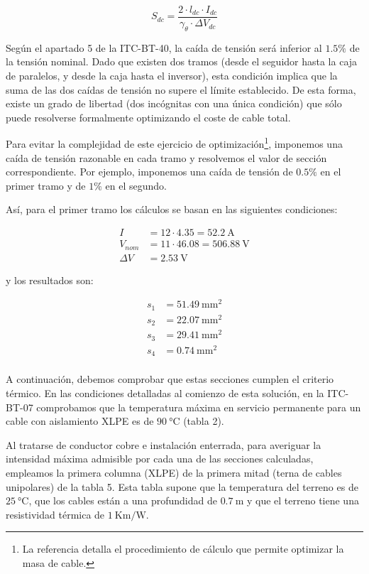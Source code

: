 \[S_{dc} =  \frac{2\cdot l_{dc}\cdot I_{dc}}{\gamma_\theta\cdot\Delta V_{dc}}\]

Según el apartado 5 de la ITC-BT-40, la caída de tensión será inferior
al $1.5\%$ de la tensión nominal. Dado que existen dos tramos (desde el
seguidor hasta la caja de paralelos, y desde la caja hasta el
inversor), esta condición implica que la suma de las dos caídas de
tensión no supere el límite establecido. De esta forma, existe un
grado de libertad (dos incógnitas con una única condición) que sólo
puede resolverse formalmente optimizando el coste de cable total. 

Para evitar la complejidad de este ejercicio de
optimización\footnote{La referencia \cite{Perpinan2012b} detalla el
  procedimiento de cálculo que permite optimizar la masa de cable.}, imponemos una
caída de tensión razonable en cada tramo y resolvemos el valor de
sección correspondiente. Por ejemplo, imponemos una caída de tensión
de $0.5\%$ en el primer tramo y de $1\%$  en el segundo.

Así, para el primer tramo los cálculos se basan en las siguientes condiciones:

\begin{align*}
  I & = 12 \cdot 4.35 = \SI{52.2}{\ampere}\\
  V_{nom} & = 11 \cdot 46.08 = \SI{506.88}{\volt}\\
  \Delta V & = \SI{2.53}{\volt}
\end{align*}

y los resultados son:

\begin{align*}
  s_1 & = \SI{51.49}{\milli\meter\squared}\\
  s_2 & = \SI{22.07}{\milli\meter\squared}\\
  s_3 & = \SI{29.41}{\milli\meter\squared}\\
  s_4 & = \SI{0.74}{\milli\meter\squared}\\
\end{align*}

A continuación, debemos comprobar que estas secciones cumplen el
criterio térmico. En las condiciones detalladas al comienzo de esta
solución, en la ITC-BT-07 comprobamos que la temperatura máxima en
servicio permanente para un cable con aislamiento XLPE es de
$\SI{90}{\celsius}$ (tabla 2). 

Al tratarse de conductor cobre e instalación enterrada, para averiguar
la intensidad máxima admisible por cada una de las secciones
calculadas, empleamos la primera columna (XLPE) de la primera
mitad (terna de cables unipolares) de la tabla 5. Esta tabla supone
que la temperatura del terreno es de $\SI{25}{\celsius}$, que los
cables están a una profundidad de $\SI{0.7}{\meter}$ y que el terreno
tiene una resistividad térmica de $\SI{1}{\kelvin\meter\per\watt}$.


